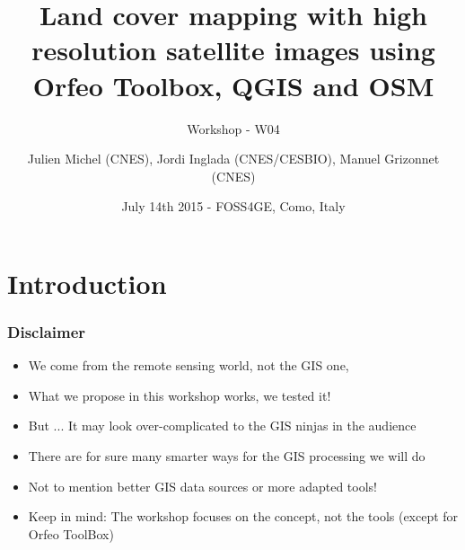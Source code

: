 \documentclass[8pt]{beamer}
\title{Land cover mapping with high resolution satellite images using Orfeo Toolbox, QGIS and OSM}
\subtitle{Workshop - W04}
\author{Julien Michel (CNES), Jordi Inglada (CNES/CESBIO), Manuel Grizonnet (CNES)}%
\date{July 14th 2015 - FOSS4GE, Como, Italy}
\begin{document}
\begin{frame}
\titlepage
\end{frame}

\section*{Introduction}

\begin{frame}
\frametitle{Disclaimer}

\begin{itemize}
\item We come from the remote sensing world, not the GIS one,
\item What we propose in this workshop works, we tested it! 
\item But ... It may look over-complicated to the GIS ninjas in the audience
\item There are for sure many smarter ways for the GIS processing we will do
\item Not to mention better GIS data sources or more adapted tools!
\item Keep in mind: The workshop focuses on the concept, not the tools (except for Orfeo ToolBox)
\end{itemize}

\end{frame}
\end{document}
